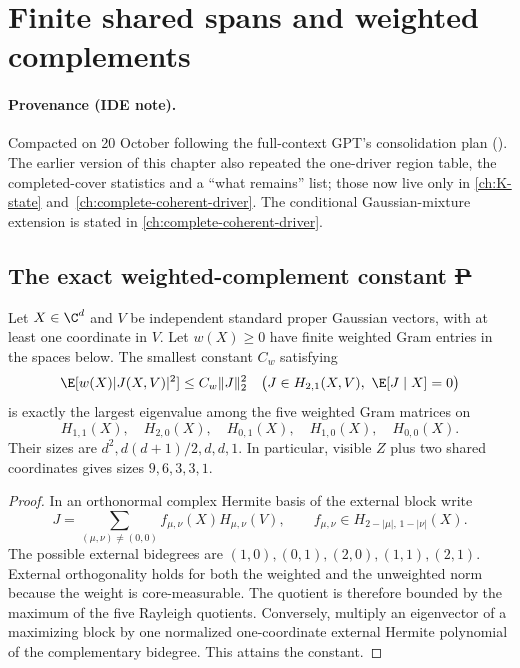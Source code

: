 \section{Finite shared spans and weighted complements}
\label{ch:milestone-map-20261020}

\paragraph{Provenance (IDE note).} Compacted on 20 October following the full-context GPT's consolidation plan ().
The earlier version of this chapter also repeated the one-driver region table, the completed-cover statistics and a ``what remains'' list; those now live only in
\autoref{ch:K-state} and~\autoref{ch:complete-coherent-driver}. The conditional Gaussian-mixture extension is stated in \autoref{ch:complete-coherent-driver}.

\subsection{The exact weighted-complement constant \st{P}}
Let $X\in\C^d$ and $V$ be independent standard proper Gaussian vectors,
with at least one coordinate in $V$. Let $w(X)\ge0$ have finite weighted
Gram entries in the spaces below. The smallest constant $C_w$ satisfying
\[
 \E[w(X)|J(X,V)|^2]\le C_w\|J\|_2^2
 \quad\bigl(J\in H_{2,1}(X,V),\ \E[J\mid X]=0\bigr)
\]
is exactly the largest eigenvalue among the five weighted Gram matrices on
\[
 H_{1,1}(X),\quad H_{2,0}(X),\quad H_{0,1}(X),\quad
 H_{1,0}(X),\quad H_{0,0}(X).
\]
Their sizes are $d^2,d(d+1)/2,d,d,1$. In particular, visible $Z$ plus
two shared coordinates gives sizes $9,6,3,3,1$.

\begin{proof}
In an orthonormal complex Hermite basis of the external block write
\[
 J=\sum_{(\mu,\nu)\ne(0,0)}
 f_{\mu,\nu}(X)H_{\mu,\nu}(V),\qquad
 f_{\mu,\nu}\in H_{2-|\mu|,\,1-|\nu|}(X).
\]
The possible external bidegrees are $(1,0),(0,1),(2,0),(1,1),(2,1)$.
External orthogonality holds for both the weighted and the unweighted
norm because the weight is core-measurable. The quotient is therefore
bounded by the maximum of the five Rayleigh quotients. Conversely,
multiply an eigenvector of a maximizing block by one normalized
one-coordinate external Hermite polynomial of the complementary
bidegree. This attains the constant.
\end{proof}

